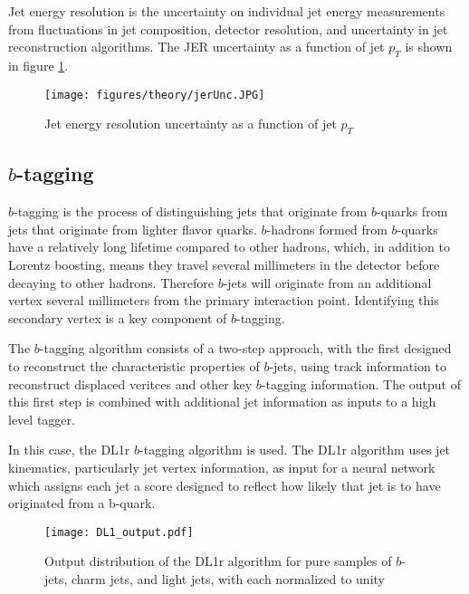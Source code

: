 Jet energy resolution is the uncertainty on individual jet energy measurements from fluctuations in jet composition, detector resolution, and uncertainty in jet reconstruction algorithms. The JER uncertainty as a function of jet $p_T$ is shown in figure \ref{fig:jerUnc}.

\begin{figure}[H]
\centering
   \texttt{[image: figures/theory/jerUnc.JPG]}
\caption{Jet energy resolution uncertainty as a function of jet $p_T$ \cite{atlascollaboration2020jet}}
\label{fig:jerUnc}
\end{figure}

\subsection{$b$-tagging}
\label{subsec:bjets}

$b$-tagging is the process of distinguishing jets that originate from $b$-quarks from jets that originate from lighter flavor quarks. $b$-hadrons formed from $b$-quarks have a relatively long lifetime compared to other hadrons, which, in addition to Lorentz boosting, means they travel several millimeters in the detector before decaying to other hadrons. Therefore $b$-jets will originate from an additional vertex several millimeters from the primary interaction point. Identifying this secondary vertex is a key component of $b$-tagging.

The $b$-tagging algorithm consists of a two-step approach, with the first designed to reconstruct the characteristic properties of $b$-jets, using track information to reconstruct displaced veritces \cite{Heer:2017kbn} and other key $b$-tagging information. The output of this first step is combined with additional jet information as inputs to a high level tagger.

In this case, the DL1r $b$-tagging algorithm is used. The DL1r algorithm \cite{btag_cal} uses jet kinematics, particularly jet vertex information, as input for a neural network which assigns each jet a score designed to reflect how likely that jet is to have originated from a b-quark. 

\begin{figure}[H] 
    \centering
    \texttt{[image: DL1\_output.pdf]} 
    \caption{Output distribution of the DL1r algorithm for pure samples of $b$-jets, charm jets, and light jets, with each normalized to unity \cite{btag_cal}}
    \label{fig:DL1r}
\end{figure}

